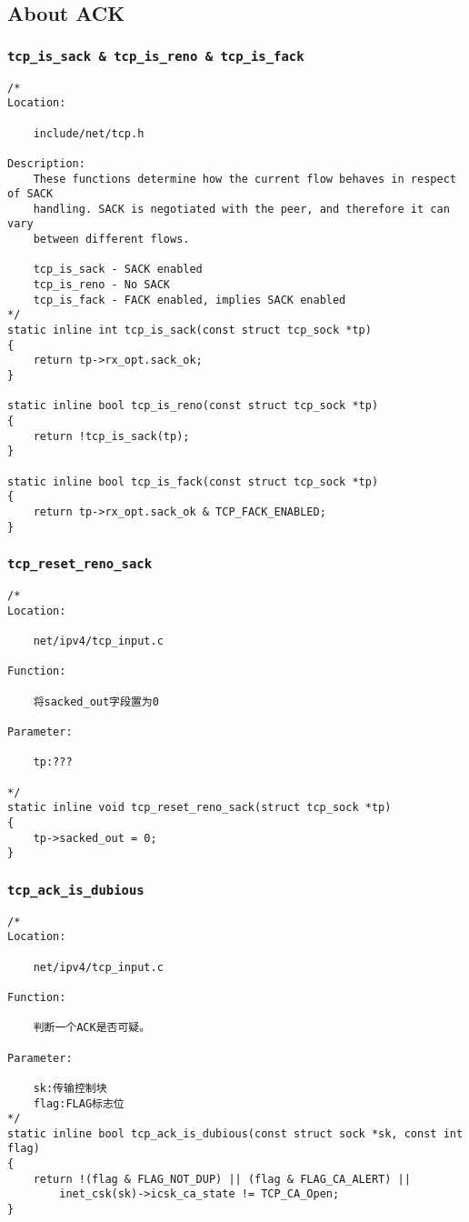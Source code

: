 	\subsection{About ACK}
		\subsubsection{\texttt{tcp_is_sack & tcp_is_reno & tcp_is_fack}}
\begin{verbatim}
/* 
Location:

	include/net/tcp.h

Description:
	These functions determine how the current flow behaves in respect of SACK
	handling. SACK is negotiated with the peer, and therefore it can vary
	between different flows.

	tcp_is_sack - SACK enabled
	tcp_is_reno - No SACK
	tcp_is_fack - FACK enabled, implies SACK enabled
*/
static inline int tcp_is_sack(const struct tcp_sock *tp)
{
	return tp->rx_opt.sack_ok;
}

static inline bool tcp_is_reno(const struct tcp_sock *tp)
{
	return !tcp_is_sack(tp);
}

static inline bool tcp_is_fack(const struct tcp_sock *tp)
{
	return tp->rx_opt.sack_ok & TCP_FACK_ENABLED;
}
\end{verbatim}

		\subsubsection{\texttt{tcp_reset_reno_sack}}
\begin{verbatim}
/*
Location:

	net/ipv4/tcp_input.c

Function:

	将sacked_out字段置为0

Parameter:

	tp:???

*/
static inline void tcp_reset_reno_sack(struct tcp_sock *tp)
{
	tp->sacked_out = 0;
}
\end{verbatim}	
		\subsubsection{\texttt{tcp_ack_is_dubious}}
\begin{verbatim}
/*
Location:

	net/ipv4/tcp_input.c

Function:

	判断一个ACK是否可疑。

Parameter:

	sk:传输控制块
	flag:FLAG标志位
*/
static inline bool tcp_ack_is_dubious(const struct sock *sk, const int flag)
{
	return !(flag & FLAG_NOT_DUP) || (flag & FLAG_CA_ALERT) ||
		inet_csk(sk)->icsk_ca_state != TCP_CA_Open;
}
\end{verbatim}

